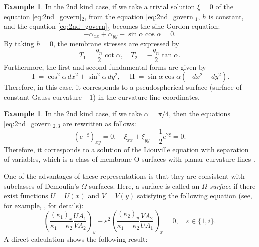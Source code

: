 \documentclass[a4paper]{amsart}
\newcommand{\first}{\operatorname{I}}
\newcommand{\second}{\operatorname{II}}
\theoremstyle{definition}
\newtheorem{ex}[thm]{Example}
\begin{document}
\begin{ex}
In the 2nd kind case, if we take a trivial solution $\xi = 0$ of the equation \eqref{eq:2nd_govern}${}_2$, from the equation \eqref{eq:2nd_govern}${}_1$, $h$ is constant, and the equation \eqref{eq:2nd_govern}${}_3$ becomes the sine-Gordon equation:
\begin{equation}
-\alpha_{xx} + \alpha_{yy} + \sin \alpha \cos \alpha = 0.
\end{equation}
By taking $h = 0$, the membrane stresses are expressed by
\begin{equation}
T_1 = \frac{q_n}{2} \cot \alpha, \quad
T_2 = - \frac{q_n}{2} \tan \alpha.
\end{equation}
Furthermore, the first and second fundamental forms are given by
\begin{equation}
\first = \cos^2 \alpha \, dx^2 + \sin^2 \alpha \, dy^2, \quad
\second = \sin \alpha \cos \alpha (-dx^2 + dy^2).
\end{equation}
Therefore, in this case, it corresponds to a pseudospherical surface (surface of constant Gauss curvature $-1$) in the curvature line coordinates.
\end{ex}
%
\begin{ex}
In the 2nd kind case, if we take $\alpha = \pi/4$, then the equations \eqref{eq:2nd_govern}${}_{2,3}$ are rewritten as follows:
\begin{equation}
(e^{-\xi})_{xy} = 0, \quad
\xi_{xx} + \xi_{yy} + \frac{1}{2} e^{2\xi} = 0.
\end{equation}
Therefore, it corresponds to a solution of the Liouville equation with separation of variables, which is a class of membrane O surfaces with planar curvature lines \cite{RSSEnneper}.
\end{ex}
%
One of the advantages of these representations is that they are consistent with subclasses of Demoulin's $\Omega$ surfaces.
Here, a surface is called an \textit{$\Omega$ surface} if there exist functions $U = U(x)$ and $V = V(y)$ satisfying the following equation (see, for example, \cite{eisenhart_transformation}, \cite{Mason} for details):
\begin{equation}
\left( \frac{(\kappa_1)_x}{\kappa_1-\kappa_2} \frac{UA_1}{VA_2} \right)_y
+ \varepsilon^2 \left( \frac{(\kappa_2)_y}{\kappa_1-\kappa_2}\frac{VA_2}{UA_1} \right)_x = 0, \quad \varepsilon \in \{1, i\}.
\end{equation}
A direct calculation shows the following result:
%
\end{document}
